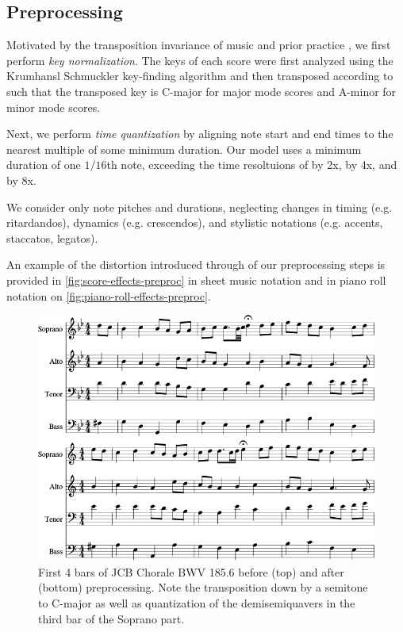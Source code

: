 \subsection{Preprocessing}

Motivated by the transposition invariance of music and prior practice
\citep{mozer1994neural} \citep{Eck2002} \citep{franklin2004recurrent}
\citep{franklin2005jazz}, we first perform \emph{key normalization}.
The keys of each score were first analyzed using the Krumhansl
Schmuckler key-finding algorithm \citep{krumhansl2001cognitive} and then
transposed according to  such that the transposed key is
C-major for major mode scores and A-minor for minor mode scores.

Next, we perform \emph{time quantization} by aligning note start and end times
to the nearest multiple of some minimum duration. Our model uses a minimum
duration of one $1/16$th note, exceeding the time resoltuions of
\citep{Boulanger-Lewandowski2012} \citep{Eck2002} by 2x,
\citep{hild1991harmonet} by 4x, and \citep{bellgard1994harmonizing} by 8x.

We consider only note pitches and durations, neglecting changes in timing
(e.g. ritardandos), dynamics (e.g. crescendos), and stylistic notations (e.g.
accents, staccatos, legatos).

An example of the distortion introduced through of our preprocessing steps is
provided in \vref{fig:score-effects-preproc} in sheet music notation and in
piano roll notation on
\vref{fig:piano-roll-effects-preproc}.
\begin{figure}[p]
    \centering
    \includegraphics[width=0.8\linewidth]{bwv185-6-original-score-1.png}

    \vspace{1.5cm}

    \includegraphics[width=0.8\linewidth]{bwv185-6-preproc-score-1.png}
    \caption{First 4 bars of JCB Chorale BWV 185.6 before (top) and after
      (bottom) preprocessing. Note the transposition down by a semitone to
      C-major as well as quantization of the demisemiquavers in the third bar of
    the Soprano part.}
    \label{fig:score-effects-preproc}
\end{figure}

